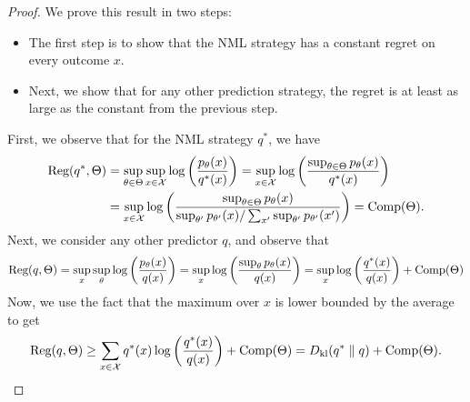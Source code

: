         \begin{proof}
            We prove this result in two steps: 
            \begin{itemize}
                \item The first step is to show that the NML strategy has a constant regret on every outcome $x$. 
                \item Next, we show that for any other prediction strategy, the regret is at least as large as the constant from the previous step. 
            \end{itemize}

            First, we observe that for the NML strategy $q^*$, we have 
            \begin{align}
                \text{Reg}(q^*, \Theta) &= \sup_{\theta \in \Theta} \sup_{x \in \mathcal{X}}  \log \left( \frac{p_\theta(x)}{q^*(x)} \right) =  \sup_{x \in \mathcal{X}} \log \left( \frac{\sup_{\theta \in \Theta} p_{\theta}(x)}{q^*(x)} \right) \\
                & =  \sup_{x \in \mathcal{X}} \log \left( \frac{\sup_{\theta \in \Theta} p_{\theta}(x)}{\sup_{\theta'} p_{\theta'}(x) / \sum_{x'} \sup_{\theta'}p_{\theta'}(x')} \right)  = \text{Comp}(\Theta). 
            \end{align}
            Next, we consider any other predictor $q$, and observe that 
            \begin{align}
                \text{Reg}(q, \Theta)  = \sup_{x} \sup_{\theta} \log \left( \frac{p_{\theta}(x)}{q(x)} \right) = \sup_{x}  \log \left( \frac{\sup_{\theta} p_{\theta}(x)}{q(x)} \right)  = \sup_{x}  \log \left( \frac{q^*(x)}{q(x)} \right)  + \text{Comp}(\Theta)
            \end{align}
            Now, we use the fact that the maximum over $x$ is lower bounded by the average to get 
            \begin{align}
                \text{Reg}(q, \Theta) \geq \sum_{x \in \mathcal{X}} q^*(x) \log \left( \frac{q^*(x)}{q(x)} \right) + \text{Comp}(\Theta) = D_{\text{kl}}(q^* \parallel q) + \text{Comp}(\Theta). 
            \end{align}
        \end{proof}
